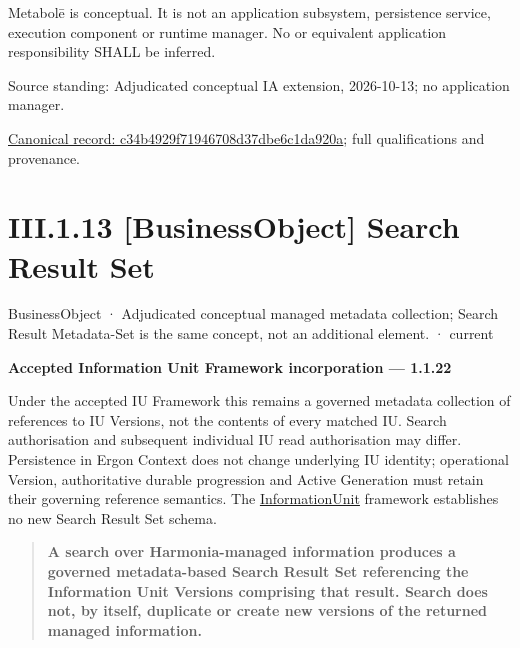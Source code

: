 Metabolē is conceptual. It is not an application subsystem, persistence service,
execution component or runtime manager. No \texttt{} or equivalent
application responsibility SHALL be inferred.



Source standing: Adjudicated conceptual IA extension, 2026-10-13; no application manager.


{\footnotesize \href{../../../../continuum/business/business-object/c34b4929f71946708d37dbe6c1da920a.md}{Canonical record: c34b4929f71946708d37dbe6c1da920a}; full qualifications and provenance.}\par
\section*{III.1.13 [BusinessObject] Search Result Set}
\label{navigation:III.1.13}

\label{element:b683ae87c72a4c16aba948a4b8cb0998}
{\small BusinessObject · Adjudicated conceptual managed metadata collection; Search Result Metadata-Set is the same concept, not an additional element. · current}\par

\par\medskip\textbf{Accepted Information Unit Framework incorporation — 1.1.22}\par


Under the accepted IU Framework this remains a governed metadata collection of references to IU Versions, not the contents of every matched IU. Search authorisation and subsequent individual IU read authorisation may differ. Persistence in Ergon Context does not change underlying IU identity; operational Version, authoritative durable progression and Active Generation must retain their governing reference semantics. The \hyperref[element:74ec609de1ae498fbf9d13e4ef8c6cbe]{InformationUnit} framework establishes no new Search Result Set schema.



\begin{quote}


\textbf{A search over Harmonia-managed information produces a governed
metadata-based Search Result Set referencing the Information Unit Versions
comprising that result. Search does not, by itself, duplicate or create new
versions of the returned managed information.}



\end{quote}


